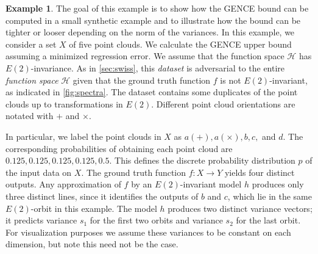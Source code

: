 \documentclass[10pt]{article} %
\theoremstyle{definition}
\newtheorem{example}{Example}
\begin{document}
\begin{example} \label{ex:invariant_regression}
The goal of this example is to show how the GENCE bound can be computed in a small synthetic example and to illustrate how the bound can be tighter or looser depending on the norm of the variances. In this example, we consider a set $X$ of five point clouds. We calculate the GENCE upper bound assuming a minimized regression error. We assume that the function space $\mathscr{H}$ has $E(2)$-invariance. As in \cref{sec:swiss}, this \textit{dataset} is adversarial to the entire \textit{function space} $\mathscr{H}$ given that the ground truth function $f$ is not $E(2)$-invariant, as indicated in \cref{fig:spectra}. The dataset contains some duplicates of the point clouds up to transformations in $E(2)$. Different point cloud orientations are notated with $+$ and $\times$. 

In particular, we label the point clouds in $X$ as $a(+), a(\times), b, c,$ and $ d$. The corresponding probabilities of obtaining each point cloud are $0.125, 0.125, 0.125, 0.125, 0.5$. This defines the discrete probability distribution $p$ of the input data on $X$. The ground truth function $f \colon X \to Y$ yields four distinct outputs. Any approximation of $f$ by an $E(2)$-invariant model $h$ produces only three distinct lines, since it identifies the outputs of $b$ and $c$, which lie in the same $E(2)$-orbit in this example. The model $h$ produces two distinct variance vectors; it predicts variance $s_1$ for the first two orbits and variance $s_2$ for the last orbit. For visualization purposes we assume these variances to be constant on each dimension, but note this need not be the case.


\end{example}
\end{document}
